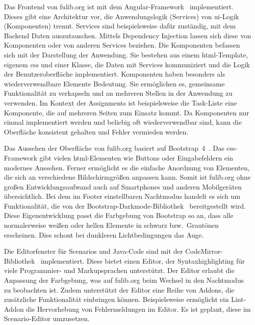 Das Frontend von fulib.org ist mit dem Angular-Framework~\cite{angular} implementiert.
Dieses gibt eine Architektur vor, die Anwendungslogik (Services) von \ac{ui}-Logik (Komponenten) trennt.
Services sind beispielsweise dafür zuständig, mit dem Backend Daten auszutauschen.
Mittels Dependency Injection lassen sich diese von Komponenten oder von anderen Services beziehen.
Die Komponenten befassen sich mit der Darstellung der Anwendung.
Sie bestehen aus einem \ac{html}-Template, eigenem \ac{css} und einer Klasse, die Daten mit Services kommuniziert und die Logik der Benutzeroberfläche implementiert.
Komponenten haben besonders als wiederverwendbare Elemente Bedeutung.
Sie ermöglichen es, gemeinsame Funktionalität zu verkapseln und an mehreren Stellen in der Anwendung zu verwenden.
Im Kontext der Assignments ist beispielsweise die Task-Liste eine Komponente, die auf mehreren Seiten zum Einsatz kommt.
Da Komponenten nur einmal implementiert werden und beliebig oft wiederverwendbar sind, kann die Oberfläche konsistent gehalten und Fehler vermieden werden.

Das Aussehen der Oberfläche von fulib.org basiert auf Bootstrap~4~\cite{bootstrap}.
Das \ac{css}-Framework gibt vielen \ac{html}-Elementen wie Buttons oder Eingabefeldern ein modernes Aussehen.
Ferner ermöglicht es die einfache Anordnung von Elementen, die sich an verschiedene Bildschirmgrößen anpassen kann.
Somit ist fulib.org ohne großen Entwicklungsaufwand auch auf Smartphones und anderen Mobilgeräten übersichtlich.
Bei dem im Footer einstellbaren Nachtmodus handelt es sich um Funktionalität, die von der Bootstrap-Darkmode-Bibliothek~\cite{bootstrap-darkmode} bereitgestellt wird.
Diese Eigenentwicklung passt die Farbgebung von Bootstrap so an, dass alle normalerweise weißen oder hellen Elemente in schwarz bzw.\ Grautönen erscheinen.
Dies schont bei dunkleren Lichtbedingungen das Auge.

Die Editorfenster für Scenarios und Java-Code sind mit der CodeMirror-Bibliothek~\cite{codemirror} implementiert.
Diese bietet einen Editor, der Syntaxhighlighting für viele Programmier- und Markupsprachen unterstützt.
Der Editor erlaubt die Anpassung der Farbgebung, was auf fulib.org beim Wechsel in den Nachtmodus zu beobachten ist.
Zudem unterstützt der Editor eine Reihe von Addons, die zusätzliche Funktionalität einbringen können.
Beispielsweise ermöglicht ein Lint-Addon die Hervorhebung von Fehlermeldungen im Editor.
Es ist geplant, diese im Scenario-Editor umzusetzen.

